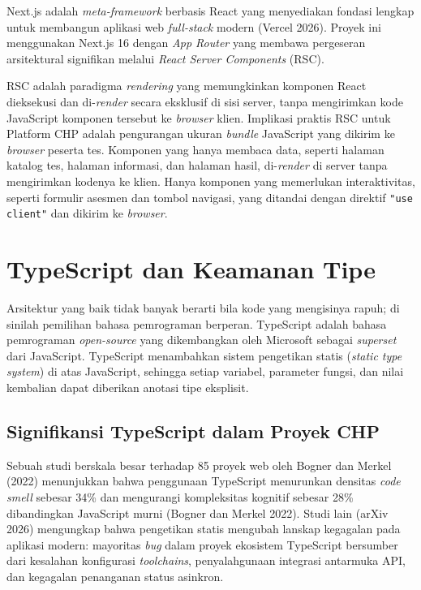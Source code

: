 Next.js adalah \textit{meta-framework} berbasis React yang menyediakan fondasi lengkap untuk membangun aplikasi web \textit{full-stack} modern (Vercel 2026). Proyek ini menggunakan Next.js 16 dengan \textit{App Router} yang membawa pergeseran arsitektural signifikan melalui \textit{React Server Components} (RSC).

RSC adalah paradigma \textit{rendering} yang memungkinkan komponen React dieksekusi dan di-\textit{render} secara eksklusif di sisi server, tanpa mengirimkan kode JavaScript komponen tersebut ke \textit{browser} klien. Implikasi praktis RSC untuk Platform CHP adalah pengurangan ukuran \textit{bundle} JavaScript yang dikirim ke \textit{browser} peserta tes. Komponen yang hanya membaca data, seperti halaman katalog tes, halaman informasi, dan halaman hasil, di-\textit{render} di server tanpa mengirimkan kodenya ke klien. Hanya komponen yang memerlukan interaktivitas, seperti formulir asesmen dan tombol navigasi, yang ditandai dengan direktif \texttt{"use client"} dan dikirim ke \textit{browser}.

\section{TypeScript dan Keamanan Tipe}
\label{sec:typescript}

Arsitektur yang baik tidak banyak berarti bila kode yang mengisinya rapuh; di sinilah pemilihan bahasa pemrograman berperan. TypeScript adalah bahasa pemrograman \textit{open-source} yang dikembangkan oleh Microsoft sebagai \textit{superset} dari JavaScript. TypeScript menambahkan sistem pengetikan statis (\textit{static type system}) di atas JavaScript, sehingga setiap variabel, parameter fungsi, dan nilai kembalian dapat diberikan anotasi tipe eksplisit.

\subsection{Signifikansi TypeScript dalam Proyek CHP}
\label{subsec:typescript-chp}

Sebuah studi berskala besar terhadap 85 proyek web oleh Bogner dan Merkel (2022) menunjukkan bahwa penggunaan TypeScript menurunkan densitas \textit{code smell} sebesar 34\% dan mengurangi kompleksitas kognitif sebesar 28\% dibandingkan JavaScript murni (Bogner dan Merkel 2022). Studi lain (arXiv 2026) mengungkap bahwa pengetikan statis mengubah lanskap kegagalan pada aplikasi modern: mayoritas \textit{bug} dalam proyek ekosistem TypeScript bersumber dari kesalahan konfigurasi \textit{toolchains}, penyalahgunaan integrasi antarmuka API, dan kegagalan penanganan status asinkron.

